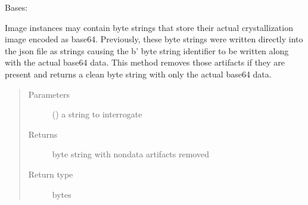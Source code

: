 \documentclass[letterpaper,10pt,english]{sphinxmanual}
\begin{document}
\begin{fulllineitems}
\label{\detokenize{polo.utils:polo.utils.io_utils.RunDeserializer}}
Bases: 

\begin{fulllineitems}
\label{\detokenize{polo.utils:polo.utils.io_utils.RunDeserializer.clean_base64_string}}
Image instances may contain byte strings that store their actual
crystallization image encoded as base64. Previously, these byte strings
were written directly into the json file as strings causing the b’
byte string identifier to be written along with the actual base64 data.
This method removes those artifacts if they are present and returns a
clean byte string with only the actual base64 data.
\begin{quote}\begin{description}
\item[{Parameters}] \leavevmode
{} () \textendash{} a string to interrogate

\item[{Returns}] \leavevmode
byte string with non\sphinxhyphen{}data artifacts removed

\item[{Return type}] \leavevmode
bytes

\end{description}\end{quote}

\end{fulllineitems}



\end{fulllineitems}
\end{document}
